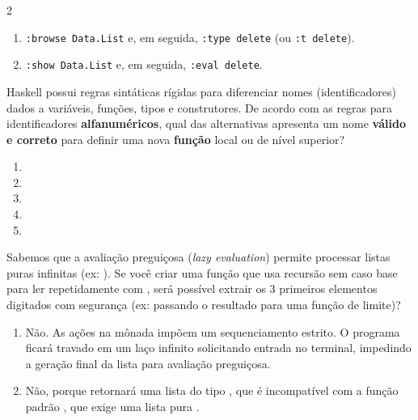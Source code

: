 \documentclass[a4paper,10pt,brazil]{article}
\begin{document}
\begin{multicols}{2}
\begin{enumerate}
  \item \texttt{:browse Data.List} e, em seguida, \texttt{:type delete} (ou \texttt{:t delete}).

  \item \texttt{:show Data.List} e, em seguida, \texttt{:eval delete}.


\end{enumerate}

Haskell possui regras sintáticas rígidas para diferenciar nomes (identificadores) dados a variáveis, funções, tipos e construtores. De acordo com as regras para identificadores \textbf{alfanuméricos}, qual das alternativas apresenta um nome \textbf{válido e correto} para definir uma nova \textbf{função} local ou de nível superior?

\begin{enumerate}
  \item {}
  \item {}

  \item {}

  \item {}

  \item {}


\end{enumerate}

Sabemos que a avaliação preguiçosa (\emph{lazy evaluation}) permite processar listas puras infinitas (ex: ). 
Se você criar uma função  que usa recursão sem caso base para ler repetidamente com , será possível extrair os 3 primeiros elementos digitados com segurança (ex: passando o resultado para uma função de limite)?

\begin{enumerate}
  \item Não. As ações na mônada  impõem um sequenciamento estrito. O programa ficará travado em um laço infinito solicitando entrada no terminal, impedindo a geração final da lista para avaliação preguiçosa.

  \item Não, porque  retornará uma lista do tipo \haskellinline{[IO String]}, que é incompatível com a função padrão , que exige uma lista pura \haskellinline{[a]}.


\end{enumerate}
\end{multicols}
\end{document}
